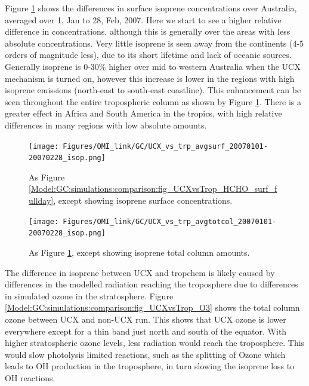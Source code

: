       Figure \ref{Model:GC:simulations:comparison:fig_UCXvsTrop_isop_surf_fullday} shows the differences in surface isoprene concentrations over Australia, averaged over 1, Jan to 28, Feb, 2007.
      Here we start to see a higher relative difference in concentrations, although this is generally over the areas with less absolute concentrations. 
      Very little isoprene is seen away from the continents (4-5 orders of magnitude less), due to its short lifetime and  lack of oceanic sources.
      Generally isoprene is 0-30\% higher over mid to western Australia when the UCX mechanism is turned on, however this increase is lower in the regions with high isoprene emissions (north-east to south-east coastline).
      This enhancement can be seen throughout the entire tropospheric column as shown by Figure \ref{Model:GC:simulations:comparison:fig_UCXvsTrop_isop_surf_fullday}.
      There is a greater effect in Africa and South America in the tropics, with high relative differences in many regions with low absolute amounts.
      
      \begin{figure}
        \texttt{[image: Figures/OMI\_link/GC/UCX\_vs\_trp\_avgsurf\_20070101-20070228\_isop.png]}
        \caption{ %
          As Figure \ref{Model:GC:simulations:comparison:fig_UCXvsTrop_HCHO_surf_fullday}, except showing isoprene surface concentrations. 
        }      
        \label{Model:GC:simulations:comparison:fig_UCXvsTrop_isop_surf_fullday}
      \end{figure}
      \begin{figure}
        \texttt{[image: Figures/OMI\_link/GC/UCX\_vs\_trp\_avgtotcol\_20070101-20070228\_isop.png]}
        \caption{ %
          As Figure \ref{Model:GC:simulations:comparison:fig_UCXvsTrop_isop_surf_fullday}, except showing isoprene total column amounts. 
        }      
        \label{Model:GC:simulations:comparison:fig_UCXvsTrop_isop_totcol_fullday}
      \end{figure}
      
      
      The difference in isoprene between UCX and tropchem is likely caused by differences in the modelled radiation reaching the troposphere due to differences in simulated ozone in the stratosphere.
      Figure \ref{Model:GC:simulations:comparison:fig_UCXvsTrop_O3} shows the total column ozone between UCX and non-UCX run.
      This shows that UCX ozone is lower everywhere except for a thin band just north and south of the equator.
      With higher stratospheric ozone levels, less radiation would reach the troposphere.
      This would slow photolysis limited reactions, such as the splitting of Ozone which leads to OH production in the troposphere, in turn slowing the isoprene loss to OH reactions.
      
